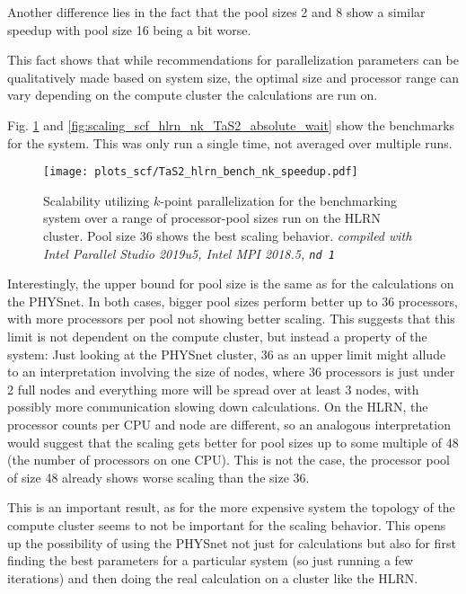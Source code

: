 \documentclass[main.tex]{subfiles}
\begin{document}
Another difference lies in the fact that the pool sizes 2 and 8 show a similar speedup with pool size 16 being a bit worse.

This fact shows that while recommendations for parallelization parameters can be qualitatively made based on system size, the optimal size and processor range can vary depending on the compute cluster the calculations are run on.

Fig. \ref{fig:scaling_scf_hlrn_nk_TaS2_speedup} and \ref{fig:scaling_scf_hlrn_nk_TaS2_absolute_wait} show the benchmarks for the \TaS system.
This was only run a single time, not averaged over multiple runs.

\begin{figure}
\centering
\texttt{[image: plots\_scf/TaS2\_hlrn\_bench\_nk\_speedup.pdf]}
\caption{Scalability utilizing \(k\)-point parallelization for the \TaS benchmarking system over a range of processor-pool sizes run on the HLRN cluster. Pool size 36 shows the best scaling behavior. \emph{\QE compiled with Intel Parallel Studio 2019u5, Intel MPI 2018.5, \texttt{nd 1}}}
\label{fig:scaling_scf_hlrn_nk_TaS2_speedup}
\end{figure}
Interestingly, the upper bound for pool size is the same as for the calculations on the PHYSnet.
In both cases, bigger pool sizes perform better up to 36 processors, with more processors per pool not showing better scaling.
This suggests that this limit is not dependent on the compute cluster, but instead a property of the \TaS system:
Just looking at the PHYSnet cluster, 36 as an upper limit might allude to an interpretation involving the size of nodes, where 36 processors is just under 2 full nodes and everything more will be spread over at least 3 nodes, with possibly more communication slowing down calculations.
On the HLRN, the processor counts per CPU and node are different, so an analogous interpretation would suggest that the scaling gets better for pool sizes up to some multiple of 48 (the number of processors on one CPU).
This is not the case, the processor pool of size 48 already shows worse scaling than the size 36.

This is an important result, as for the more expensive \TaS system the topology of the compute cluster seems to not be important for the scaling behavior.
This opens up the possibility of using the PHYSnet not just for calculations but also for first finding the best parameters for a particular system (so just running a few iterations) and then doing the real calculation on a cluster like the HLRN.
\end{document}
